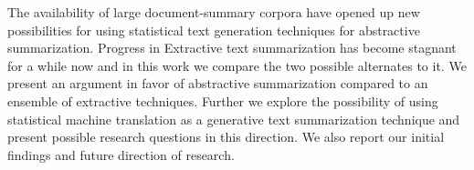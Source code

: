 The availability of large document-summary corpora have opened up new possibilities for using statistical text generation techniques for abstractive summarization. Progress in Extractive text summarization has become stagnant for a while now and in this work we compare the two possible alternates to it. We present an argument in favor of abstractive summarization compared to an ensemble of extractive techniques. Further we explore the possibility of using statistical machine translation as a generative text summarization technique and present possible research questions in this direction. We also report our initial findings and future direction of research.
